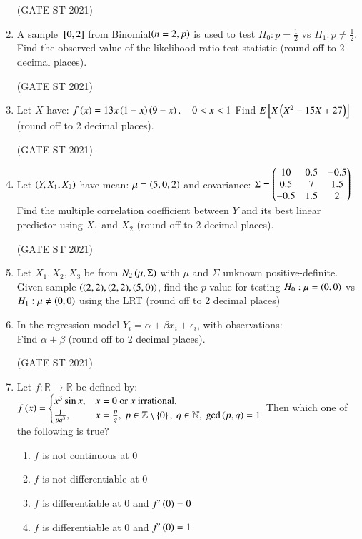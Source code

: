 \documentclass[journal,12pt,onecolumn]{IEEEtran}
\theoremstyle{remark}
\begin{document}
\begin{enumerate}
\hfill (GATE ST 2021) \\

\item
A sample ${}\left[0,2\right]$ from Binomial$\left(n=2,p\right)$ is used to test $H_0: p = \frac12$ vs $H_1: p \ne \frac12$.  
Find the observed value of the likelihood ratio test statistic (round off to 2 decimal places).

\hfill (GATE ST 2021) \\

\item
Let $X$ have:
$
f\left(x\right) = 13x\left(1-x\right)\left(9-x\right), \quad 0 < x < 1
$
Find $E{}\left[ X\left(X^2 - 15X + 27\right)\right]$ (round off to 2 decimal places).

\hfill (GATE ST 2021) \\

\item
Let $\left(Y, X_1, X_2\right)$ have mean:
$
\mu = \left(5,0,2\right)
$
and covariance:
$
\Sigma =
\begin{pmatrix}
10 & 0.5 & -0.5 \\
0.5 & 7 & 1.5 \\
-0.5 & 1.5 & 2\end{pmatrix}
$
Find the multiple correlation coefficient between $Y$ and its best linear predictor using $X_1$ and $X_2$ (round off to 2 decimal places).

\hfill (GATE ST 2021) \\

\item
Let $X_1, X_2, X_3$ be from $N_2\left(\mu, \Sigma\right)$ with $\mu$ and $\Sigma$ unknown positive-definite.  
Given sample $\left((2,2), (2,2), (5,0)\right)$, find the $p$-value for testing $H_0: \mu = \left(0,0\right)$ vs $H_1: \mu \neq \left(0,0\right)$ using the LRT (round off to 2 decimal places)

\item
In the regression model $Y_i = \alpha + \beta x_i + \epsilon_i$,  
with observations: \\
 
\bigskip
Find $\alpha + \beta$ (round off to 2 decimal places).

\hfill (GATE ST 2021) \\


\item
Let $f: \mathbb{R} \to \mathbb{R}$ be defined by:
$
f\left(x\right) =
\begin{cases}
x^3 \sin x, & x = 0 \ \text{or $x$ irrational}, \\
\frac{1}{p q^3}, & x = \frac{p}{q}, \ p \in \mathbb{Z} \setminus \left\{0\right\}, \ q \in \mathbb{N}, \ \gcd\left(p,q\right) = 1
\end{cases}
$
Then which one of the following is true?
\begin{enumerate}
\item $f$ is not continuous at $0$
\item $f$ is not differentiable at $0$
\item $f$ is differentiable at $0$ and $f'\left(0\right) = 0$
\item $f$ is differentiable at $0$ and $f'\left(0\right) = 1$
\end{enumerate}


\end{enumerate}
\end{document}

